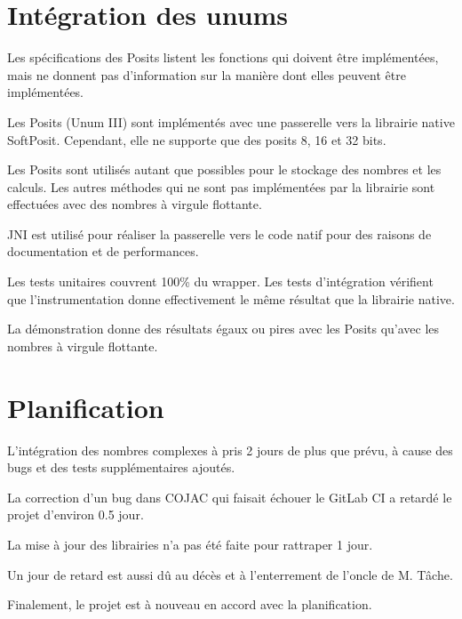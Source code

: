 \documentclass[11pt]{meetingmins}
\begin{document}
\section{Intégration des unums}
\begin{hiddenitems}
    \item Les spécifications des Posits listent les fonctions qui doivent être implémentées, mais ne donnent pas d'information sur la manière dont elles peuvent être implémentées.
    \item Les Posits (Unum III) sont implémentés avec une passerelle vers la librairie native SoftPosit. Cependant, elle ne supporte que des posits 8, 16 et 32 bits.
    \item Les Posits sont utilisés autant que possibles pour le stockage des nombres et les calculs. Les autres méthodes  qui ne sont pas implémentées par la librairie sont effectuées avec des nombres à virgule flottante.
    \item JNI est utilisé pour réaliser la passerelle vers le code natif pour des raisons de documentation et de performances.
    \item Les tests unitaires couvrent 100\% du wrapper. Les tests d'intégration vérifient que l'instrumentation donne effectivement le même résultat que la librairie native.
    \item La démonstration donne des résultats égaux ou pires avec les Posits qu'avec les nombres à virgule flottante.
\end{hiddenitems}

\section{Planification}
\begin{hiddenitems}
    \item L'intégration des nombres complexes à pris 2 jours de plus que prévu, à cause des bugs et des tests supplémentaires ajoutés.
    \item La correction d'un bug dans COJAC qui faisait échouer le GitLab CI a retardé le projet d'environ 0.5 jour.
    \item La mise à jour des librairies n'a pas été faite pour rattraper 1 jour.
    \item Un jour de retard est aussi dû au décès et à l'enterrement de l'oncle de M. Tâche.
    \item Finalement, le projet est à nouveau en accord avec la planification.
\end{hiddenitems}
\end{document}
